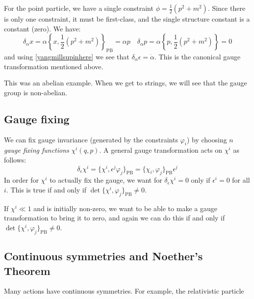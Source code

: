 \documentclass{jknotes}
\begin{document}
\begin{eg}
    For the point particle, we have a single constraint \(\phi=\frac{1}{2}(p^2+m^2)\). Since there is only one constraint, it must be first-class, and the single structure constant is a constant (zero). We have:
    \begin{equation}
        \delta_\alpha x = \alpha \left\{ x,\frac{1}{2}(p^2+m^2) \right\}_{\text{PB}} = \alpha p 
        \quad
        \delta_\alpha p = \alpha \left\{ p,\frac{1}{2}(p^2+m^2) \right\} = 0
    \end{equation}
    and using \eqref{yangmillsupinhere} we see that \(\delta_\alpha\epsilon = \dot{\alpha}\). This is the canonical gauge transformation mentioned above.
\end{eg}
This was an abelian example. When we get to strings, we will see that the gauge group is non-abelian.

\subsection{Gauge fixing}
We can fix gauge invariance (generated by the constraints \(\varphi_i\)) by choosing \(n\) \emph{gauge fixing functions} \(\chi^i(q,p)\). A general gauge transformation acts on \(\chi^i\) as follows:
\begin{equation}
    \delta_\epsilon \chi^i = \{\chi^i,\epsilon^j\varphi_j\}_{\text{PB}} = \{\chi_i,\varphi_j\}_{\text{PB}}\epsilon^j
\end{equation}
In order for \(\chi^i\) to actually fix the gauge, we want for \(\delta_\epsilon\chi^i=0\) only if \(\epsilon^i=0\) for all \(i\). This is true if and only if \(\det\{\chi^i,\varphi_j\}_{\text{PB}}\ne0\).

If \(\chi^i\ll1\) and is initially non-zero, we want to be able to make a gauge transformation to bring it to zero, and again we can do this if and only if \(\det\{\chi^i,\varphi_j\}_{\text{PB}}\ne0\).

\subsection{Continuous symmetries and Noether's Theorem}
Many actions have continuous symmetries. For example, the relativistic particle
\end{document}

